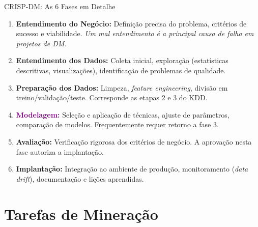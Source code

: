 \documentclass[aspectratio=169]{beamer}
\begin{document}
\begin{frame}{CRISP-DM: As 6 Fases em Detalhe}
    \small
    \begin{enumerate}
        \item[\textbf{1.}] \textbf{\textcolor{mineblue}{Entendimento do Negócio:}}
            Definição precisa do problema, critérios de sucesso e viabilidade.
            \textit{Um mal entendimento é a principal causa de falha em projetos de DM.}
        \pause
        \item[\textbf{2.}] \textbf{\textcolor{mineorange}{Entendimento dos Dados:}}
            Coleta inicial, exploração (estatísticas descritivas, visualizações), identificação de problemas de qualidade.
        \pause
        \item[\textbf{3.}] \textbf{\textcolor{minegreen}{Preparação dos Dados:}}
            Limpeza, \textit{feature engineering}, divisão em treino/validação/teste. Corresponde as etapas 2 e 3 do KDD.
        \pause
        \item[\textbf{4.}] \textbf{\textcolor{purple}{Modelagem:}}
            Seleção e aplicação de técnicas, ajuste de parâmetros, comparação de modelos. Frequentemente requer retorno a fase 3.
        \pause
        \item[\textbf{5.}] \textbf{\textcolor{minered}{Avaliação:}}
            Verificação rigorosa dos critérios de negócio. A aprovação nesta fase autoriza a implantação.
        \pause
        \item[\textbf{6.}] \textbf{\textcolor{mineblue}{Implantação:}}
            Integração ao ambiente de produção, monitoramento (\textit{data drift}), documentação e lições aprendidas.
    \end{enumerate}
\end{frame}

\section{Tarefas de Mineração}
\end{document}
